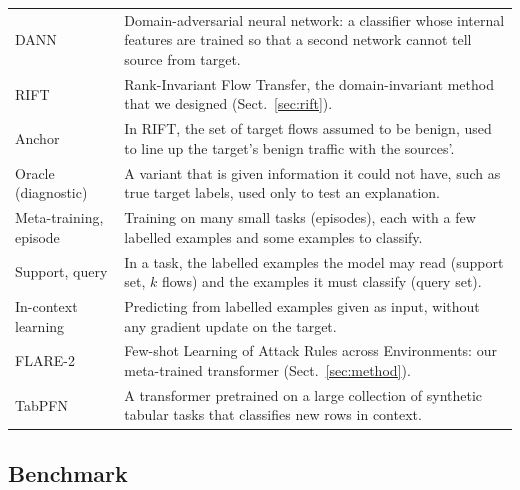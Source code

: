 \documentclass[pdflatex,sn-mathphys-num]{sn-jnl}%
\begin{document}
\begin{table}[htbp]
\begin{tabular}{p{}p{}}
DANN & Domain-adversarial neural network: a classifier whose internal features are trained so that a second network cannot tell source from target. \\
RIFT & Rank-Invariant Flow Transfer, the domain-invariant method that we designed (Sect.~\ref{sec:rift}). \\
Anchor & In RIFT, the set of target flows assumed to be benign, used to line up the target's benign traffic with the sources'. \\
Oracle (diagnostic) & A variant that is given information it could not have, such as true target labels, used only to test an explanation. \\
Meta-training, episode & Training on many small tasks (episodes), each with a few labelled examples and some examples to classify. \\
Support, query & In a task, the labelled examples the model may read (support set, $k$ flows) and the examples it must classify (query set). \\
In-context learning & Predicting from labelled examples given as input, without any gradient update on the target. \\
FLARE-2 & Few-shot Learning of Attack Rules across Environments: our meta-trained transformer (Sect.~\ref{sec:method}). \\
TabPFN & A transformer pretrained on a large collection of synthetic tabular tasks that classifies new rows in context. \\
\bottomrule
\end{tabular}
\end{table}

\subsection{Benchmark}\label{sec:benchdata}
\end{document}
